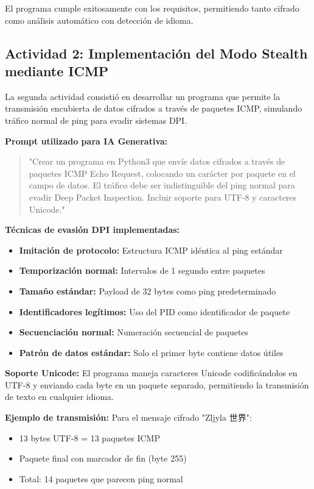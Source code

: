 \documentclass[letter,12pt]{article}
\begin{document}
El programa cumple exitosamente con los requisitos, permitiendo tanto cifrado como análisis automático con detección de idioma.

\subsection{Actividad 2: Implementación del Modo Stealth mediante ICMP}

La segunda actividad consistió en desarrollar un programa que permite la transmisión encubierta de datos cifrados a través de paquetes ICMP, simulando tráfico normal de ping para evadir sistemas DPI.

\textbf{Prompt utilizado para IA Generativa:}
\begin{quote}
"Crear un programa en Python3 que envíe datos cifrados a través de paquetes ICMP Echo Request, colocando un carácter por paquete en el campo de datos. El tráfico debe ser indistinguible del ping normal para evadir Deep Packet Inspection. Incluir soporte para UTF-8 y caracteres Unicode."
\end{quote}

\textbf{Técnicas de evasión DPI implementadas:}
\begin{itemize}
    \item \textbf{Imitación de protocolo:} Estructura ICMP idéntica al ping estándar
    
    \item \textbf{Temporización normal:} Intervalos de 1 segundo entre paquetes
    
    \item \textbf{Tamaño estándar:} Payload de 32 bytes como ping predeterminado
    
    \item \textbf{Identificadores legítimos:} Uso del PID como identificador de paquete
    
    \item \textbf{Secuenciación normal:} Numeración secuencial de paquetes
    
    \item \textbf{Patrón de datos estándar:} Solo el primer byte contiene datos útiles
\end{itemize}

\textbf{Soporte Unicode:}
El programa maneja caracteres Unicode codificándolos en UTF-8 y enviando cada byte en un paquete separado, permitiendo la transmisión de texto en cualquier idioma.

\textbf{Ejemplo de transmisión:}
Para el mensaje cifrado "Zljyla 世界":
\begin{itemize}
    \item 13 bytes UTF-8 = 13 paquetes ICMP
    
    \item Paquete final con marcador de fin (byte 255)
    
    \item Total: 14 paquetes que parecen ping normal
\end{itemize}
\end{document}
